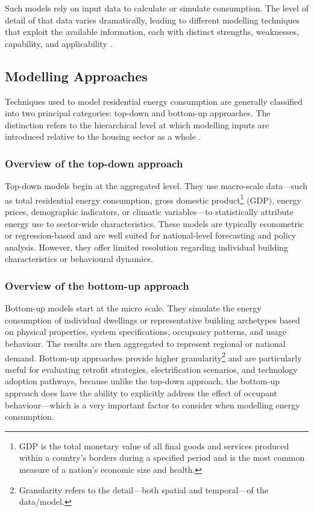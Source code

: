 Such models rely on input data to calculate or simulate consumption. The level of detail of that data varies dramatically, leading to different modelling techniques that exploit the available information, each with distinct strengths, weaknesses, capability, and applicability \cite{swan_modeling_2009}.


\subsection{Modelling Approaches}\label{sec:modelling_approaches}
Techniques used to model residential energy consumption are generally classified into two principal categories: top-down and bottom-up approaches. The distinction refers to the hierarchical level at which modelling inputs are introduced relative to the housing sector as a whole \cite{swan_modeling_2009}.

\subsubsection*{Overview of the top-down approach}
Top-down models begin at the aggregated level. They use macro-scale data—such as total residential energy consumption, gross domestic product\footnote{GDP is the total monetary value of all final goods and services produced within a country's borders during a specified period and is the most common measure of a nation's economic size and health.} (GDP), energy prices, demographic indicators, or climatic variables—to statistically attribute energy use to sector-wide characteristics. These models are typically econometric or regression-based and are well suited for national-level forecasting and policy analysis. However, they offer limited resolution regarding individual building characteristics or behavioural dynamics. 

\subsubsection*{Overview of the bottom-up approach}\label{sec:bottom_up}
Bottom-up models start at the micro scale. They simulate the energy consumption of individual dwellings or representative building archetypes based on physical properties, system specifications, occupancy patterns, and usage behaviour. The results are then aggregated to represent regional or national demand. Bottom-up approaches provide higher granularity\footnote{Granularity refers to the detail—both spatial and temporal—of the data/model.} and are particularly useful for evaluating retrofit strategies, electrification scenarios, and technology adoption pathways, because unlike the top-down approach, the bottom-up approach does have the ability to explicitly address the effect of occupant behaviour—which is a very important factor to consider when modelling energy consumption.

